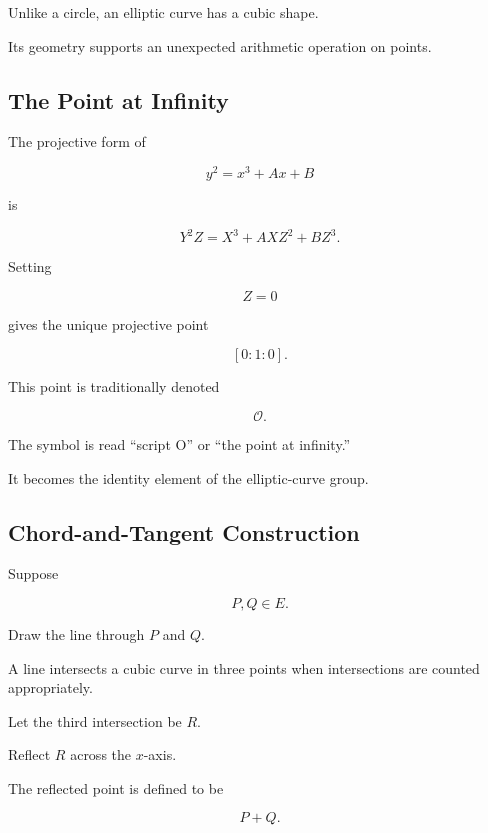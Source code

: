 Unlike a circle, an elliptic curve has a cubic shape.

Its geometry supports an unexpected arithmetic operation on points.

\subsection{The Point at Infinity}
\label{subsec:elliptic-point-infinity}

The projective form of

\[ y^2=x^3+Ax+B \]

is

\[ Y^2Z=X^3+AXZ^2+BZ^3. \]

Setting

\[ Z=0 \]

gives the unique projective point

\[ [0:1:0]. \]

This point is traditionally denoted

\[ \mathcal O. \]

The symbol is read ``script O'' or ``the point at infinity.''

It becomes the identity element of the elliptic-curve group.

\subsection{Chord-and-Tangent Construction}
\label{subsec:elliptic-chord-tangent}

Suppose

\[ P,Q\in E. \]

Draw the line through \(P\) and \(Q\).

A line intersects a cubic curve in three points when intersections are
counted appropriately.

Let the third intersection be \(R\).

Reflect \(R\) across the \(x\)-axis.

The reflected point is defined to be

\[ P+Q. \]

\begin{centereddiagram}
\end{centereddiagram}

